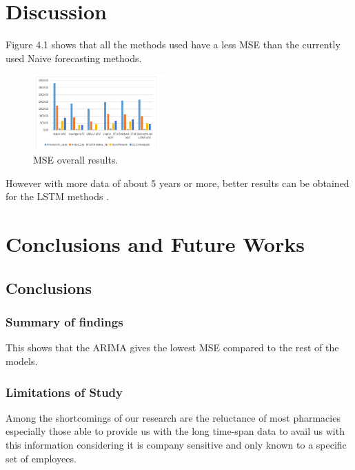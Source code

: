\documentclass[12pt]{report}
\begin{document}
\chapter{Discussion}

Figure 4.1 shows that all the methods used have a less MSE than the currently used Naive forecasting methods.\\
\begin{figure}[H]%
\begin {center}
\includegraphics[width=0.45\textwidth]{images/chart.png}
\caption{MSE overall results.}
\label{fig:ecg}
\end {center}
\end{figure}

However with more data of about 5 years or more, better results can be obtained for the LSTM methods .


\chapter{Conclusions and Future Works}

\section{Conclusions}

\subsection{Summary of findings}
This shows that the ARIMA gives the lowest MSE compared to the rest of the models.
\subsection{Limitations of Study}
Among the shortcomings of our research are the reluctance of most pharmacies especially those able to provide us with the long time-span data to avail us with this information considering it is company sensitive and only known to a specific set of employees.
\end{document}
